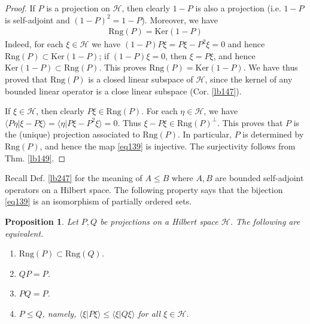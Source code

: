\documentclass[12pt,b5paper,notitlepage]{article}
\theoremstyle{definition}
\theoremstyle{plain}
\newtheorem{pp}[df]{Proposition}
\newcommand{\mc}{\mathcal}
\newcommand{\bk}[1]{\langle {#1}\rangle}
\newcommand{\Ker}{\mathrm{Ker}}
\newcommand{\Rng}{\mathrm{Rng}}
\newcommand{\MH}{\mathcal H}
\numberwithin{equation}{section}
\begin{document}
\begin{proof}
If $P$ is a projection on $\MH$, then clearly $1-P$ is also a projection (i.e. $1-P$ is self-adjoint and $(1-P)^2=1-P$). Moreover, we have
\begin{align}\label{eq138}
\Rng(P)=\Ker(1-P)
\end{align}
Indeed, for each $\xi\in\MH$ we have $(1-P)P\xi=P\xi-P^2\xi=0$ and hence $\Rng(P)\subset\Ker(1-P)$; if $(1-P)\xi=0$, then $\xi=P\xi$, and hence $\Ker(1-P)\subset\Rng(P)$. This proves $\Rng(P)=\Ker(1-P)$. We have thus proved that $\Rng(P)$ is a closed linear subspace of $\MH$, since the kernel of any bounded linear operator is a close linear subspace (Cor. \ref{lb147}).

If $\xi\in\MH$, then clearly $P\xi\in\Rng(P)$. For each $\eta\in\MH$, we have $\bk{P\eta|\xi-P\xi}=\bk{\eta|P\xi-P^2\xi}=0$. Thus $\xi-P\xi\in\Rng(P)^\perp$. This proves that $P$ is the (unique) projection associated to $\Rng(P)$. In particular, $P$ is determined by $\Rng(P)$, and hence the map \eqref{eq139} is injective. The surjectivity follows from Thm. \ref{lb149}.
\end{proof}


Recall Def. \ref{lb247} for the meaning of $A\leq B$ where $A,B$ are bounded self-adjoint operators on a Hilbert space. The following property says that the bijection \eqref{eq139} is an isomorphism of partially ordered sets.


\begin{pp}\label{lb249}
Let $P,Q$ be projections on a Hilbert space $\MH$. The following are equivalent.
\begin{enumerate}[label=(\arabic*)]
\item $\Rng(P)\subset \Rng(Q)$.
\item $QP=P$.
\item $PQ=P$. 
\item $P\leq Q$, namely, $\bk{\xi|P\xi}\leq \bk{\xi|Q\xi}$ for all $\xi\in\mc H$.
\end{enumerate}
\end{pp}
\end{document}
